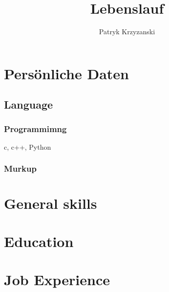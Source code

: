 \documentclass{article}
\begin{document}
\title{Lebenslauf}
\author{Patryk Krzyzanski}
\maketitle

\section{Pers\"onliche Daten}
\subsection{Language}
\subsubsection{Programmimng}
c, c++, Python
\subsubsection{Murkup}
\section{General skills}
\section{Education}
\section{Job Experience}
\end{document}
